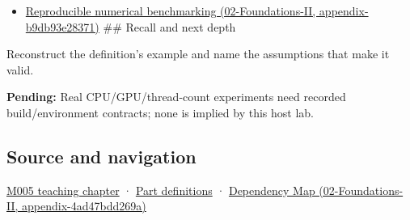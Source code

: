 \begin{itemize}
\tightlist
\item
  \href{../02-Foundations-II/main.pdf\#nameddest=appendix-b9db93e28371}{Reproducible numerical benchmarking (02-Foundations-II, appendix-b9db93e28371)} \#\# Recall and next depth
\end{itemize}

Reconstruct the definition's example and name the assumptions that make it valid.

\textbf{Pending:} Real CPU/GPU/thread-count experiments need recorded build/environment contracts; none is implied by this host lab.

\subsection{Source and navigation}\label{appendix-5f1a2c3f97ff-source-and-navigation}

\hyperref[01-foundations-i-ch001-when-arithmetic-meets-uncertainty]{M005 teaching chapter} · \hyperref[appendix-fd090d982a15-m005---parts-77-88]{Part definitions} · \href{../02-Foundations-II/main.pdf\#nameddest=appendix-4ad47bdd269a}{Dependency Map (02-Foundations-II, appendix-4ad47bdd269a)}
